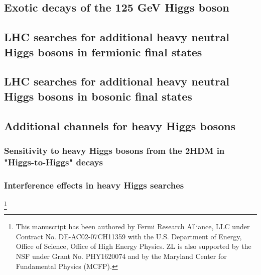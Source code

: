 \documentclass[../report.tex]{subfiles}
\providecommand{\main}{..}
\begin{document}
 

%

\subsection{Exotic decays of the 125 GeV Higgs boson}\label{Sec:9.1Exo}









\subsection{LHC searches for additional heavy neutral Higgs bosons in fermionic final states}\label{sec:Hff}




\subsection{LHC searches for additional heavy neutral Higgs bosons in bosonic final states}\label{sec:XZZ}


\subsection{Additional channels for heavy Higgs bosons}\label{Sec:9.4}




\subsubsection{Sensitivity to heavy Higgs bosons from the 2HDM in "Higgs-to-Higgs" decays}




\subsubsection{Interference effects in heavy Higgs searches}\label{Sec.9.4.2}
\footnote{This manuscript has been authored by Fermi Research Alliance, LLC under Contract No. DE-AC02-07CH11359 with the U.S. Department of Energy, Office of Science, Office of High Energy Physics. ZL is also supported by the NSF under Grant No. PHY1620074 and by the Maryland Center for Fundamental Physics (MCFP).}
\end{document}
